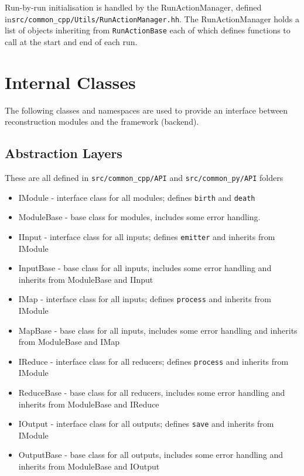 Run-by-run initialisation is handled by the RunActionManager, defined in\linebreak\verb|src/common_cpp/Utils/RunActionManager.hh|. The RunActionManager holds a list of objects inheriting from \verb|RunActionBase| each of which defines functions to call at the start and end of each run.

\section{Internal Classes}
The following classes and namespaces are used to provide an interface between
reconstruction modules and the framework (backend).

\subsection{Abstraction Layers}
These are all defined in \verb|src/common_cpp/API| and \verb|src/common_py/API|
folders

\begin{itemize}
\item IModule - interface class for all modules; defines \verb|birth| and 
\verb|death|
\item ModuleBase - base class for modules, includes some error handling.
\item IInput - interface class for all inputs; defines \verb|emitter| and 
              inherits from IModule
\item InputBase - base class for all inputs, includes some error handling and
             inherits from ModuleBase and IInput
\item IMap - interface class for all inputs; defines \verb|process| and 
              inherits from IModule
\item MapBase - base class for all inputs, includes some error handling and 
              inherits from ModuleBase and IMap
\item IReduce - interface class for all reducers; defines \verb|process| and 
              inherits from IModule
\item ReduceBase - base class for all reducers, includes some error handling and
              inherits from ModuleBase and IReduce
\item IOutput - interface class for all outputs; defines \verb|save| and 
              inherits from IModule
\item OutputBase - base class for all outputs, includes some error handling and 
              inherits from ModuleBase and IOutput
\end{itemize}

